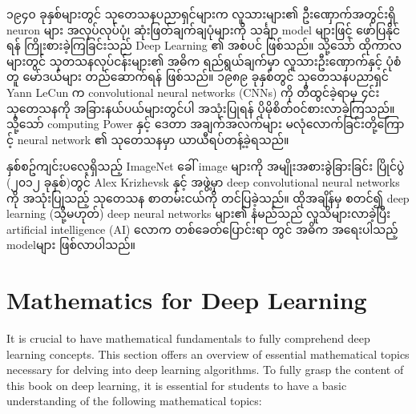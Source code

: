 ၁၉၄၀ ခုနှစ်များတွင် သုတေသနပညာရှင်များက လူသားများ၏ ဦးဏှောက်အတွင်းရှိ neuron များ အလုပ်လုပ်ပုံ၊ ဆုံးဖြတ်ချက်ချပုံများကို သင်္ချာ model များဖြင့် ဖော်ပြနိုင်ရန် ကြိုးစားခဲ့ကြခြင်းသည် Deep Learning ၏ အစပင် ဖြစ်သည်။
သို့သော် ထိုကာလများတွင် သုတသနလုပ်ငန်းများ၏ အဓိက ရည်ရွယ်ချက်မှာ လူသားဦးဏှောက်နှင့် ပုံစံတူ မော်ဒယ်များ တည်ဆောက်ရန်  ဖြစ်သည်။ ၁၉၈၉ ခုနှစ်တွင် သုတေသနပညာရှင် Yann LeCun က convolutional neural networks (CNNs) ကို တီထွင်ခဲ့ရာမှ ၄င်းသုတေသနကို အခြားနယ်ပယ်များတွင်ပါ အသုံးပြုရန် ပိုမိုစိတ်၀င်စားလာခဲ့ကြသည်။ သို့သော် computing Power နှင့် ဒေတာ အချက်အလက်များ မလုံလောက်ခြင်းတို့ကြောင့် neural network ၏ သုတေသနမှာ ယာယီရပ်တန့်ခဲ့ရသည်။

နှစ်စဥ်ကျင်းပလေ့ရှိသည့် ImageNet ခေါ် image များကို အမျိုးအစားခွဲခြားခြင်း ပြိုင်ပွဲ (၂၀၁၂ ခုနှစ်)တွင် Alex Krizhevsk နှင့် အဖွဲ့မှာ deep convolutional neural networks  ကို အသုံးပြုသည့် သုတေသန စာတမ်းငယ်ကို တင်ပြခဲ့သည်။ ထိုအချိန်မှ စတင်၍ deep learning (သို့မဟုတ်) deep neural networks များ၏ နံမည်သည် လူသိများလာခဲ့ပြီး artificial intelligence (AI) လောက တစ်ခေတ်ပြောင်းရာ တွင် အဓိက အရေးပါသည့် modelများ ဖြစ်လာပါသည်။


\section{Mathematics for Deep Learning}\label{mathsforDLL}
It is crucial to have mathematical fundamentals to fully comprehend deep learning concepts. This section offers an overview of essential mathematical topics necessary for delving into deep learning algorithms. To fully grasp the content of this book on deep learning, it is essential for students to have a basic understanding of the following mathematical topics:

